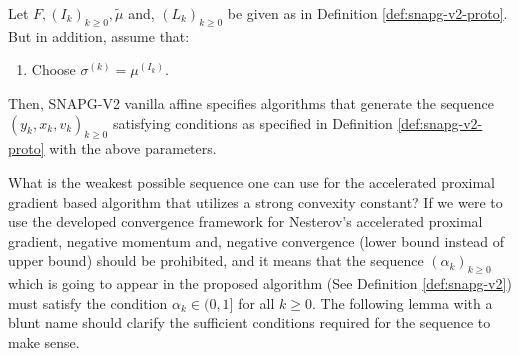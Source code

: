 \documentclass[12pt]{article}
\begin{document}
    \begin{definition}\label{def:snapg-v2}
        Let $F, (I_k)_{k \ge 0}, \tilde \mu$ and, $(L_k)_{k \ge 0}$ be given as in Definition \ref{def:snapg-v2-proto}. 
        But in addition, assume that: 
        \begin{enumerate}[nosep]
            \item Choose $\sigma^{(k)} = \mu^{(I_k)}$. 
        \end{enumerate}
        Then, SNAPG-V2 vanilla affine specifies algorithms that generate the sequence $(y_k, x_k, v_k)_{k \ge 0}$ satisfying conditions as specified in Definition \ref{def:snapg-v2-proto} with the above parameters. 
    \end{definition}
    What is the weakest possible sequence one can use for the accelerated proximal gradient based algorithm that utilizes a strong convexity constant? 
    If we were to use the developed convergence framework for Nesterov's accelerated proximal gradient, negative momentum and, negative convergence (lower bound instead of upper bound) should be prohibited, and it means that the sequence $(\alpha_k)_{k \ge 0}$ which is going to appear in the proposed algorithm (See Definition \ref{def:snapg-v2}) must satisfy the condition $\alpha_k \in (0, 1]$ for all $k \ge 0$. 
    The following lemma with a blunt name should clarify the sufficient conditions required for the sequence to make sense. 
\end{document}
